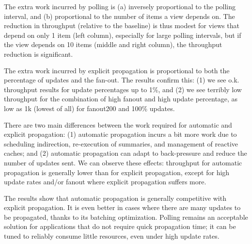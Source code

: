  The extra work incurred by polling is (a) inversely proportional to the polling interval, and (b) proportional to the number of items a view depends on. The reduction in throughput (relative to the baseline) is thus modest for views that depend on only 1 item (left column), especially for large polling intervals, but if the view depends on 10 items (middle and right column), the throughput reduction is significant.

 The extra work incurred by explicit propagation is proportional to both the percentage of updates and the fan-out. The results confirm this: (1) we see o.k. throughput results for update percentages up to 1\%, and (2) we see terribly low throughput for the combination of high fanout and high update percentage, as low as 1k (lowest of all) for fanout200 and 100\% updates.

 There are two main differences between the work required for automatic and explicit propagation: (1) automatic propagation incurs a bit more work due to scheduling indirection, re-execution of summaries, and management of reactive caches;  and (2) automatic propagation can adapt to back-pressure and reduce the number of updates sent.  We can observe these effects: throughput for automatic propagation is generally lower than for explicit propagation, except for high update rates and/or fanout where explicit propagation suffers more. 
 
 The results show that automatic propagation is generally competitive with explicit propagation. It is even better in cases where there are many updates to be propagated, thanks to its batching optimization. Polling remains an acceptable solution for applications that do not require quick propagation time; it can be tuned to reliably consume little resources, even under high update rates.

 
 


